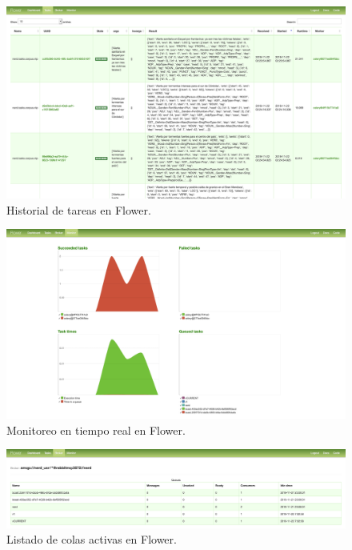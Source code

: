 \documentclass[12pt,a4paper,]{scrartcl}
\begin{document}
\begin{figure}[H]

{\centering \includegraphics{assets/developer/flower-task-history.png} 

}

\caption{Historial de tareas en Flower.}\label{fig:developer-flower-task-history}
\end{figure}

\begin{figure}[H]

{\centering \includegraphics{assets/developer/flower-monitoring.png} 

}

\caption{Monitoreo en tiempo real en Flower.}\label{fig:developer-flower-monitoring}
\end{figure}

\begin{figure}[H]

{\centering \includegraphics{assets/developer/flower-broker.pdf} 

}

\caption{Listado de colas activas en Flower.}\label{fig:developer-flower-broker}
\end{figure}
\end{document}
